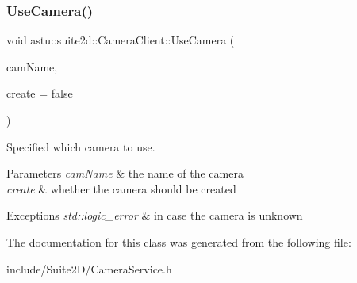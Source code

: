 \subsubsection{\texorpdfstring{Use\+Camera()}{UseCamera()}}
{\footnotesize\ttfamily void astu\+::suite2d\+::\+Camera\+Client\+::\+Use\+Camera (\begin{DoxyParamCaption}\item[{const std\+::string \&}]{cam\+Name,  }\item[{bool}]{create = {\ttfamily false} }\end{DoxyParamCaption})}

Specified which camera to use.


\begin{DoxyParams}{Parameters}
{\em cam\+Name} & the name of the camera \\
\hline
{\em create} & whether the camera should be created \\
\hline
\end{DoxyParams}

\begin{DoxyExceptions}{Exceptions}
{\em std\+::logic\+\_\+error} & in case the camera is unknown \\
\hline
\end{DoxyExceptions}


The documentation for this class was generated from the following file\+:\begin{DoxyCompactItemize}
\item 
include/\+Suite2\+D/Camera\+Service.\+h\end{DoxyCompactItemize}
